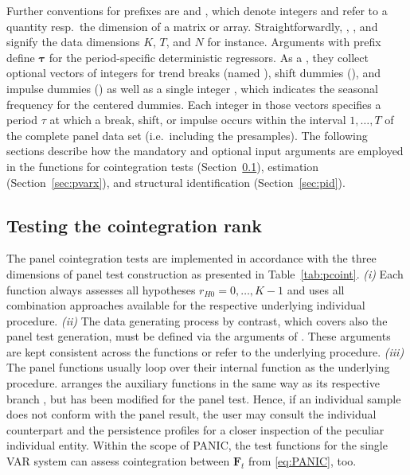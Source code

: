 Further conventions for prefixes are  and , which denote integers and refer to a quantity resp.~the dimension of a matrix or array. Straightforwardly, , , and  signify the data dimensions $ K $, $ T $, and $ N $ for instance. Arguments with prefix \mbox{} define $ \boldsymbol{\tau} $ for the period-specific deterministic regressors. As a , they collect optional vectors of integers for trend breaks (named ), shift dummies (), and impulse dummies () as well as a single integer , which indicates the seasonal frequency for the centered dummies. Each integer in those vectors specifies a period $ \tau $ at which a break, shift, or impulse occurs within the interval $ 1,\ldots,T $ of the complete panel data set (i.e.~including the presamples). The following sections describe how the mandatory and optional input arguments are employed in the  functions for cointegration tests (Section~\ref{sec:pcoint}), estimation (Section~\ref{sec:pvarx}), and structural identification (Section~\ref{sec:pid}).


\subsection{Testing the cointegration rank} \label{sec:pcoint}
The panel cointegration tests are implemented in accordance with the three dimensions of panel test construction as presented in Table~\ref{tab:pcoint}. \textit{(i)} Each  function always assesses all hypotheses $ r_{H0} = 0,\ldots,K-1 $ and uses all combination approaches available for the respective underlying individual procedure. \textit{(ii)} The data generating process by contrast, which covers also the panel test generation, must be defined via the arguments of \mbox{}. These arguments are kept consistent across the functions or refer to the underlying procedure. \textit{(iii)} The panel functions  usually loop over their internal function  as the underlying procedure.  arranges the auxiliary functions in the same way as its respective branch \mbox{}, but has been modified for the panel test. Hence, if an individual sample does not conform with the panel result, the user may consult the individual counterpart  and the persistence profiles  for a closer inspection of the peculiar individual entity. Within the scope of PANIC, the test functions  for the single VAR system can assess cointegration between $ \boldsymbol{F}_t $ from \eqref{eq:PANIC}, too.


